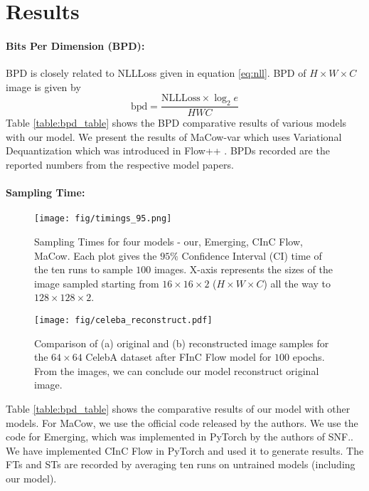 \documentclass[a4paper,twoside]{article}
\theoremstyle{definition}
\begin{document}
\section{Results}\label{sec:results}
\paragraph{Bits Per Dimension (BPD):}
BPD is closely related to NLLLoss given in equation \ref{eq:nll}. BPD of $H \times W \times C$ image is given by
\begin{equation}
\label{eq:bpd}
    \text{bpd} = \frac{\text{NLLLoss} \times\log_2{e}}{H W C} 
\end{equation}
Table \ref{table:bpd_table} shows the BPD comparative results of various models with our model. We present the results of MaCow-var which uses Variational Dequantization which was introduced in Flow++ \citep{ho2019flow++}. BPDs recorded are the reported numbers from the respective model papers.

\paragraph{Sampling Time:}\label{section:SamplingTimes}
\begin{figure*}[!ht]
    \centering
    \texttt{[image: fig/timings\_95.png]}
    \caption{Sampling Times for four models - our, Emerging, CInC Flow,  MaCow. Each plot gives the $95\%$ Confidence Interval (CI) time of the ten runs to sample $100$ images. X-axis represents the sizes of the image sampled starting from $16 \times 16 \times 2$ ($H \times W \times C$) all the way to $128 \times 128 \times 2$. }
    \label{fig:timing}
\end{figure*}



\begin{figure*}[!ht]
    \centering
    \texttt{[image: fig/celeba\_reconstruct.pdf]}
    \caption{Comparison of  (a) original and (b) reconstructed image samples for the $64 \times 64$ CelebA dataset after FInC Flow model for $100$ epochs. From the images, we can conclude our model reconstruct original image.}
    \label{fig:celeba_reconstruct}
\end{figure*}
Table \ref{table:bpd_table} shows the comparative results of our model with other models. For MaCow, we use the official code released by the authors. We use the code for Emerging, which was implemented in PyTorch by the authors of SNF.. We have implemented CInC Flow in PyTorch and used it to generate results.
The FTs and STs are recorded by averaging ten runs on untrained models (including our model). 
\end{document}

